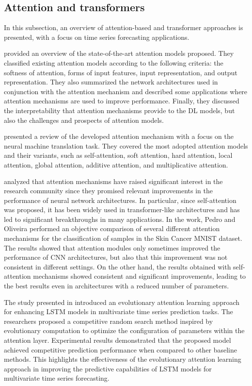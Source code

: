 \subsection{Attention and transformers}
\label{sec:transformers}
\vspace{0.1 cm}

In this subsection, an overview of attention-based and transformer approaches is presented, with a focus on time series forecasting applications.

\cite{NIU202148} provided an overview of the state-of-the-art attention models proposed.
They classified existing attention models according to the following criteria: the softness of attention, forms of input features, input representation, and output representation.
They also summarized the network architectures used in conjunction with the attention mechanism and described some applications where attention mechanisms are used to improve performance.
Finally, they discussed the interpretability that attention mechanisms provide to the DL models, but also the challenges and prospects of attention models.

\cite{9586824} presented a review of the developed attention mechanism with a focus on the neural machine translation task.
They covered the most adopted attention models and their variants, such as self-attention, soft attention, hard attention, local attention, global attention, additive attention, and multiplicative attention.

\cite{9892274} analyzed that attention mechanisms have raised significant interest in the research community since they promised relevant improvements in the performance of neural network architectures.
In particular, since self-attention was proposed, it has been widely used in transformer-like architectures and has led to significant breakthroughs in many applications.
In the work, Pedro and Oliveira performed an objective comparison of several different attention mechanisms for the classification of samples in the Skin Cancer MNIST dataset.
The results showed that attention modules only sometimes improved the performance of CNN architectures, but also that this improvement was not consistent in different settings.
On the other hand, the results obtained with self-attention mechanisms showed consistent and significant improvements, leading to the best results even in architectures with a reduced number of parameters.

The study presented in \cite{LI2019104785} introduced an evolutionary attention learning approach for enhancing LSTM models in multivariate time series prediction tasks.
The researchers proposed a competitive random search method inspired by evolutionary computation to optimize the configuration of parameters within the attention layer.
Experimental results demonstrated that the proposed model achieved competitive prediction performance when compared to other baseline methods.
This highlights the effectiveness of the evolutionary attention learning approach in improving the predictive capabilities of LSTM models for multivariate time series forecasting.

